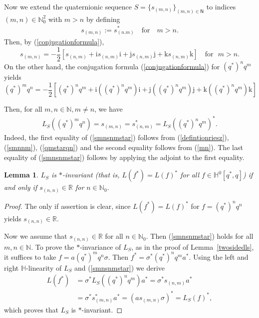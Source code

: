 \documentclass[11pt,a4paper]{amsart}
\newtheorem{lemma}[theorem]{Lemma}
\theoremstyle{definition}
\begin{document}
Now we extend the quaternionic sequence
$S=\{s_{(m,n)}\}_{(m,n) \in \mathsf{{N}}}$ to indices
$(m,n)\in \mathbb{N}_{0}^{2}$ with $m>n$ by defining
%
\begin{align}
\label{mn}
s_{(m,n)}:=s_{(n.m)}^{*}\quad \text{for}\quad m>n.
\end{align}
%
Then, by (\ref{conjugationformula}),
%
\begin{equation}
\label{smnnm}
s_{(m,n)} = -\frac{1}{2}[ s_{(n,m)}+ \mathrm{i}s_{(n,m)} \mathrm{i}+
\mathrm{j}s_{(n,m)} \mathrm{j}+ \mathrm{k}s_{(n,m)} \mathrm{k}]
\quad \textrm{for}~~~ m>n.
\end{equation}
%
On the other hand, the conjugation formula (\ref{conjugationformula}) for
$ (q^{*})^{n} q^{m}$ yields
%
\begin{equation}
\label{qmstarqn}
(q^{*})^{m} q^{n} = -\frac{1}{2}[ (q^{*})^{n} q^{m} + \mathrm{i}( (q^{*})^{n}
q^{m})\mathrm{i}+ \mathrm{j}( (q^{*})^{n} q^{m})\mathrm{j}+
\mathrm{k}( (q^{*})^{n} q^{m})\mathrm{k}]
\end{equation}

Then, for all $m,n\in \mathbb{N}, m\neq n$, we have
%
\begin{align}
\label{smnsnmstar}
L_{S}((q^{*})^{m}q^{n})=s_{(m,n)}=s_{(n,m)}^{*}=L_{S}((q^{*})^{n}q^{m})^{*}.
\end{align}
%
Indeed, the first equality of (\ref{smnsnmstar}) follows from (\ref{defintionriesz}),
(\ref{smnnm}), (\ref{qmstarqn}) and the second equality follows from (\ref{mn}).
The last equality of (\ref{smnsnmstar}) follows by applying the adjoint
to the first equality.

\begin{lemma}%
\label{lsstarinvariant}
$L_{S}$ is $*$-invariant (that is, $L(f^{*})=L(f)^{*}$ for all
$f\in \mathbb{H}^{0}[q^{*}, q]$) if and only if
$s_{(n,n)}\in \mathbb{R}$ for $n\in \mathbb{N}_{0}$.
\end{lemma}
%
\begin{proof}
The only if assertion is clear, since $L(f^{*})=L(f)^{*}$ for
$f=(q^{*})^{n}q^{n}$ yields $s_{(n,n)}\in \mathbb{R}$.

Now we assume that $s_{(n,n)}\in \mathbb{R}$ for all
$n\in \mathbb{N}_{0}$. Then (\ref{smnsnmstar}) holds for all
$m,n\in \mathbb{N}$. To prove the $*$-invariance of $L_{S}$, as in the
proof of Lemma~\ref{twosidedls}, it suffices to take
$f=a (q^{*})^{m} q^{n} \sigma $. Then
$f^{*}=\sigma ^{*} (q^{*})^{n}q^{m} a^{*}$. Using the left and right
$\mathbb{H}$-linearity of $L_{S}$ and (\ref{smnsnmstar}) we derive
%
\begin{align*}
L(f^{*}) &=\sigma ^{*} L_{S}( (q^{*})^{n}q^{m}) a^{*}=\sigma ^{*}s_{(n,m)}
a^{*}
\\
&=\sigma ^{*}s_{(m,n)}^{*} a^{*}= (a s_{(m,n)}\sigma )^{*}=L_{S}(f)^{*},
\end{align*}
%
which proves that $L_{S}$ is $*$-invariant.
\end{proof}
\end{document}
